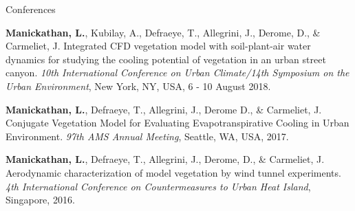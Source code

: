 \documentclass[11pt, a4paper]{preamble/awesome-cv-novo}
\begin{document}
\begin{cventries}
  \cvpubentry
  {Conferences}
  {
    \begin{cvitems}
      \item {\textbf{Manickathan, L.}, Kubilay, A., Defraeye, T., Allegrini, J., Derome, D., \& Carmeliet, J.
             Integrated CFD vegetation model with soil-plant-air water dynamics for studying the cooling potential
             of vegetation in an urban street canyon. {\bodyfontlight\textit{10th International Conference on 
             Urban Climate/14th Symposium on the Urban Environment}, New York, NY, USA, 6 - 10 August 2018.}}
      \item {\textbf{Manickathan, L.}, Defraeye, T., Allegrini, J., Derome D., \& Carmeliet, J. Conjugate 
             Vegetation Model for Evaluating Evapotranspirative Cooling in Urban Environment. 
             {\bodyfontlight\textit{97th AMS Annual Meeting}, Seattle, WA, USA, 2017.}}
      \item {\textbf{Manickathan, L.}, Defraeye, T., Allegrini, J., Derome, D., \& Carmeliet, J. Aerodynamic 
             characterization of model vegetation by wind tunnel experiments. {\bodyfontlight\textit{4th 
             International Conference on Countermeasures to Urban Heat Island}, Singapore, 2016.}}
    \end{cvitems}
  }

\end{cventries}
\end{document}
